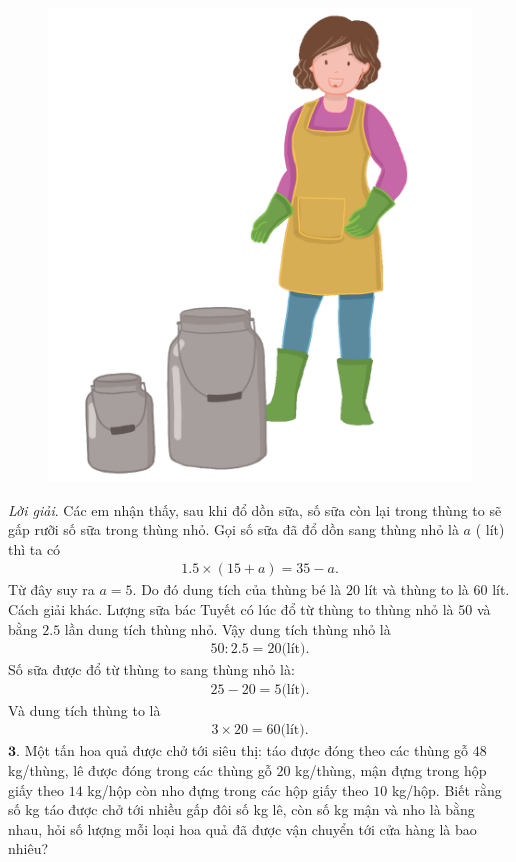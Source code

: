 \begin{multicols}{2}
\begin{figure}[H]
	 	\centering
	 	\vspace*{5pt}
	 	\captionsetup{labelformat= empty, justification=centering}
	 	\includegraphics[width=0.75\linewidth]{Pi3_bai2}
	 	\vspace*{-5pt}
	 \end{figure}
	\textit{Lời giải}. Các em nhận thấy, sau khi đổ dồn sữa, số sữa còn lại trong thùng to sẽ gấp rưỡi số sữa trong thùng nhỏ. Gọi số sữa đã đổ dồn sang thùng nhỏ là $a$ ( lít) thì ta có 
	\begin{align*}
		1{.}5\times (15+a)=35-a.
	\end{align*}
	Từ đây suy ra $a =5$. Do đó dung tích của thùng bé là $20$ lít và thùng to là $60$ lít.
	\vskip 0.1cm
	Cách giải khác. Lượng sữa bác Tuyết có lúc đổ từ thùng to thùng nhỏ là $50$ và bằng $2{.}5$ lần dung tích thùng nhỏ. Vậy dung tích thùng nhỏ là 
	\begin{align*}
		50: 2{.}5  = 20 \text{(lít).} 
	\end{align*}
	Số sữa được đổ từ thùng to sang thùng nhỏ là: 
	\begin{align*}
		25-20=5 \text{(lít).} 
	\end{align*}
	Và dung tích thùng to là 
	\begin{align*}
		3 \times 20=60 \text{(lít).}
	\end{align*}
	$\pmb{3.}$ Một tấn hoa quả được chở tới siêu thị: táo được đóng theo các thùng gỗ  $48$ kg/thùng, lê được đóng trong các thùng gỗ $20$ kg/thùng, mận đựng trong hộp giấy theo $14$ kg/hộp còn nho đựng trong các hộp giấy theo $10$ kg/hộp. Biết rằng số kg táo được chở tới nhiều gấp đôi số kg lê, còn số kg mận và nho là bằng nhau, hỏi số lượng mỗi loại hoa quả đã được vận chuyển tới cửa hàng là bao nhiêu?

\end{multicols}
